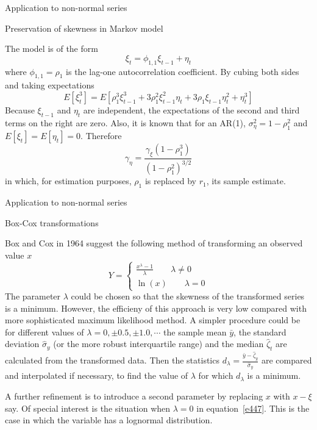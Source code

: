 \documentclass[8pt]{beamer}
\renewcommand{\emph}[1]{\textcolor{myorange}{#1}}
\begin{document}
\begin{frame}{Application to non-normal series}
    \begin{block}{Preservation of skewness in Markov model}
    \end{block}
    The model is of the form
    \begin{equation}
        \xi_t = \phi_{1,1} \xi_{t-1} + \eta_t
        \label{e446a}
    \end{equation}
    where $\phi_{1,1} = \rho_1$ is the \emph{lag-one autocorrelation coefficient}. By cubing both sides and taking expectations
\begin{equation}
    E[\xi_t^3]  = E[\rho_1^3 \xi_{t-1}^3 + 3\rho_1^2 \xi_{t-1}^2 \eta_t + 3\rho_1 \xi_{t-1}\eta_t^2 + \eta_t^3]
        \label{e446b}
    \end{equation}
    Because $\xi_{t-1}$ and $\eta_t$ are independent, the expectations of the second and third terms on the right are zero. Also, it is known that for an \emph{AR(1)}, $\sigma_{\eta}^2 = 1-\rho_1^2$ and $E[\xi_t] = E[\eta_t] = 0$. Therefore
\begin{equation}
    \gamma_{\eta} = \frac{\gamma_{\xi} (1-\rho_1^3)}{(1-\rho_1^2 )^{3/2}}
        \label{e446}
    \end{equation}
    in which, for estimation purposes, $\rho_1$ is replaced by $r_1$, its \emph{sample estimate}.

\end{frame}

\begin{frame}{Application to non-normal series}
    \begin{block}{Box-Cox transformations}
    \end{block}
    Box and Cox in 1964 suggest the following method of transforming an observed value $x$
    \begin{equation}
Y = \left\{
\begin{array}{c}
    \frac{x^{\lambda}-1}{\lambda} \quad \quad \lambda \neq 0 \\
    \ln(x) \quad \quad \lambda = 0
\end{array}
\right.
\label{e447}
\end{equation}
The parameter $\lambda$ could be chosen so that the skewness of the transformed series is a minimum. However, the efficieny of this approach is very low compared with more sophisticated \emph{maximum likelihood} method. A simpler procedure could be for different values of $\lambda = 0, \pm 0.5, \pm 1.0, \cdots$ the \emph{sample mean} $\bar{y}$, the \emph{standard deviation} $\hat{\sigma}_y$ (or the more robust interquartile range) and the \emph{median} $\hat{\zeta}_t$ are calculated from the transformed data. Then the statistics $d_\lambda = \frac{\bar{y}-\hat{\zeta}_y}{\hat{\sigma}_y}$ are compared and interpolated if necessary, to find the value of $\lambda$ for which $d_\lambda$ is a minimum. 

A further refinement is to introduce a second parameter by replacing $x$ with $x-\xi$ say. Of special interest is the situation when $\lambda = 0$ in equation~\ref{e447}. This is the case in which the variable has a \emph{lognormal distribution}.
\end{frame}
 
\end{document}
